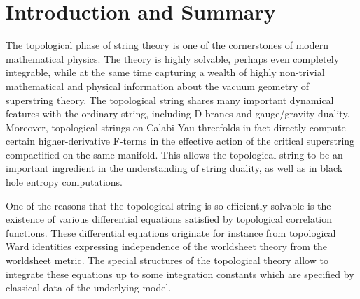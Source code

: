 \tableofcontents
\newpage

\section{Introduction and Summary}

The topological phase of string theory is one of the cornerstones
of modern mathematical physics. The theory is highly solvable, perhaps
even completely integrable, while at the same time capturing a wealth
of highly non-trivial mathematical and physical information about 
the vacuum geometry of superstring theory. The topological string 
shares many important dynamical features with the ordinary string, 
including D-branes and gauge/gravity duality. Moreover, topological 
strings on Calabi-Yau threefolds in fact directly compute certain 
higher-derivative F-terms in the effective action of the critical 
superstring compactified on the same manifold. This allows the topological 
string to be an important ingredient in the understanding of string 
duality, as well as in black hole entropy computations.

One of the reasons that the topological string is so efficiently solvable
is the existence of various differential equations satisfied by topological 
correlation functions. These differential equations originate for instance 
from topological Ward identities expressing independence of the worldsheet 
theory from the worldsheet metric. The special structures of the topological 
theory allow to integrate these equations up to some integration constants 
which are specified by classical data of the underlying model.

